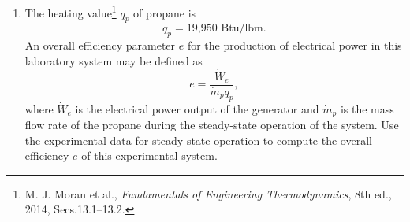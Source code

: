 \documentclass[12pt]{article}
\begin{document}
\begin{enumerate}
\item The heating value\footnote{M. J. Moran et al., {\em Fundamentals
of Engineering Thermodynamics}, 8th ed., 2014, Secs.13.1--13.2.} $q_p$
of propane is 
\begin{equation}
q_{p} = \mbox{19,950 Btu/lbm}.
\end{equation}
An overall efficiency parameter $e$ for the production of 
electrical power in this laboratory system may be defined as 
\begin{equation}
e = \frac{\dot{W}_{e}}{\dot{m}_{p}q_{p}},
\end{equation}
where $\dot{W}_{e}$ is the electrical power output of the 
generator and $\dot{m}_{p}$ is the mass flow rate of the propane 
during the steady-state operation of the system.  Use the experimental
data for steady-state operation to compute the overall efficiency 
$e$ of this experimental system.   


\end{enumerate}
\end{document}
